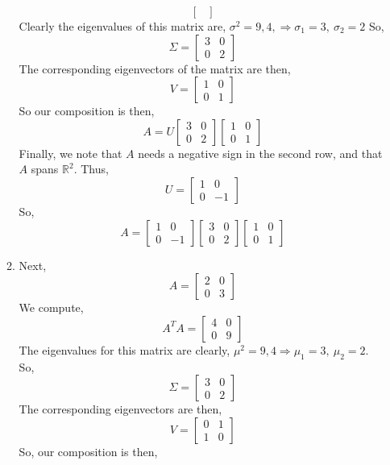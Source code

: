 \documentclass[letterpaper,10pt]{article}
\newcommand{\R}{\mathbb{R}}
\begin{document}
\begin{enumerate}
\begin{enumerate}
\[\begin{bmatrix}
\end{bmatrix} \]
Clearly the eigenvalues of this matrix are, $\sigma^2=9,4, \Rightarrow \sigma_1=3,\ \sigma_2=2$
So,
\[\Sigma=\begin{bmatrix}
3 & 0\\0 & 2
\end{bmatrix} \]
The corresponding eigenvectors of the matrix are then,
\[V=\begin{bmatrix}
1 & 0\\0 & 1
\end{bmatrix} \]
So our composition is then,
\[A=U\begin{bmatrix}
3 & 0\\0 & 2
\end{bmatrix} \begin{bmatrix}
1 & 0\\0 & 1
\end{bmatrix}\]
Finally, we note that $A$ needs a negative sign in the second row, and that $A$ spans $\R^2$. Thus,
\[U=\begin{bmatrix}
1 & 0\\0 & -1
\end{bmatrix}\]
So,
\[A=\begin{bmatrix}
1 & 0\\0 & -1
\end{bmatrix}\begin{bmatrix}
3 & 0\\0 & 2
\end{bmatrix} \begin{bmatrix}
1 & 0\\0 & 1
\end{bmatrix}\]
\item Next,
\[A=\begin{bmatrix}
2 & 0\\0 & 3
\end{bmatrix} \]
We compute,
\[A^TA=\begin{bmatrix}
4 & 0\\0 & 9
\end{bmatrix} \]
The eigenvalues for this matrix are clearly, $\mu^2=9,4\Rightarrow \mu_1=3,\ \mu_2=2$. So,
\[\Sigma=\begin{bmatrix}
3 & 0\\0 & 2
\end{bmatrix} \]
The corresponding eigenvectors are then,
\[V=\begin{bmatrix}
0 & 1\\
1 & 0
\end{bmatrix} \]
So, our composition is then,

\end{enumerate}
\end{enumerate}
\end{document}
